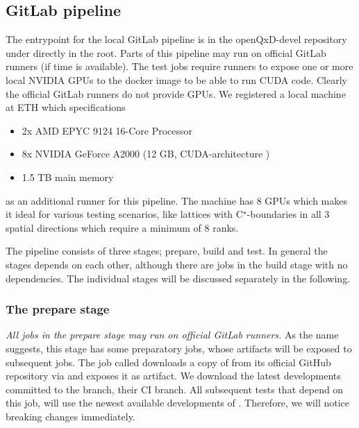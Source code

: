 \subsection{GitLab pipeline}
\label{sec:cicd:pipeline:gitlab}

The entrypoint for the local GitLab pipeline is in the openQxD-devel repository\cite{gitlab:openqxd-devel} under  directly in the root.
Parts of this pipeline may run on official GitLab runners (if time is available).
The test jobs require runners to expose one or more local NVIDIA GPUs to the docker image to be able to run CUDA code.
Clearly the official GitLab runners do not provide GPUs.
We registered a local machine at ETH which specifications
\begin{itemize}
    \item 2x AMD EPYC 9124 16-Core Processor
    \item 8x NVIDIA GeForce A2000 (12 GB, CUDA-architecture )
    \item 1.5 TB main memory
\end{itemize}
as an additional runner for this pipeline. The machine has 8 GPUs which makes it ideal for various testing scenarios, like lattices with C$^\star$-boundaries in all $3$ spatial directions which require a minimum of 8 ranks.

The pipeline consists of three stages; prepare, build and test.
In general the stages depends on each other, although there are jobs in the build stage with no dependencies.
The individual stages will be discussed separately in the following.

\subsubsection{The prepare stage}

\emph{All jobs in the prepare stage may run on official GitLab runners.}
As the name suggests, this stage has some preparatory jobs, whose artifacts will be exposed to subsequent jobs.
The job called  downloads a copy of \quda from its official GitHub repository \cite{github:quda} via  and exposes it as artifact.
We download the latest developments committed to the  branch, \ie their CI branch.
All subsequent tests that depend on this job, will use the newest available developments of \quda.
Therefore, we will notice breaking changes immediately.

